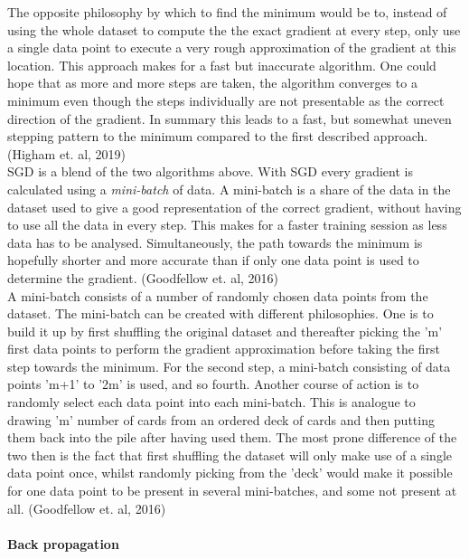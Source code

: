 \documentclass{article}
\begin{document}
\noindent The opposite philosophy by which to find the minimum would be to, instead of using the whole dataset to compute the the exact gradient at every step, only use a single data point to execute a very rough approximation of the gradient at this location. This approach makes for a fast but inaccurate algorithm. One could hope that as more and more steps are taken, the algorithm converges to a minimum even though the steps individually are not presentable as the correct direction of the gradient. In summary this leads to a fast, but somewhat uneven stepping pattern to the minimum compared to the first described approach.(Higham et. al, 2019)\\

\noindent SGD is a blend of the two algorithms above. With SGD every gradient is calculated using a \textit{mini-batch} of data. A mini-batch is a share of the data in the dataset used to give a good representation of the correct gradient, without having to use all the data in every step. This makes for a faster training session as less data has to be analysed. Simultaneously, the path towards the minimum is hopefully shorter and more accurate than if only one data point is used to determine the gradient. (Goodfellow et. al, 2016)\\

\noindent A mini-batch consists of a number of randomly chosen data points from the dataset. The mini-batch can be created with different philosophies. One is to build it up by first shuffling the original dataset and thereafter picking the 'm' first data points to perform the gradient approximation before taking the first step towards the minimum. For the second step, a mini-batch consisting of data points 'm+1' to '2m' is used, and so fourth. Another course of action is to randomly select each data point into each mini-batch. This is analogue to drawing 'm' number of cards from an ordered deck of cards and then putting them back into the pile after having used them. The most prone difference of the two then is the fact that first shuffling the dataset will only make use of a single data point once, whilst randomly picking from the 'deck' would make it possible for one data point to be present in several mini-batches, and some not present at all. (Goodfellow et. al, 2016)




\paragraph{Back propagation}\label{sec: backprop}\\
\end{document}
